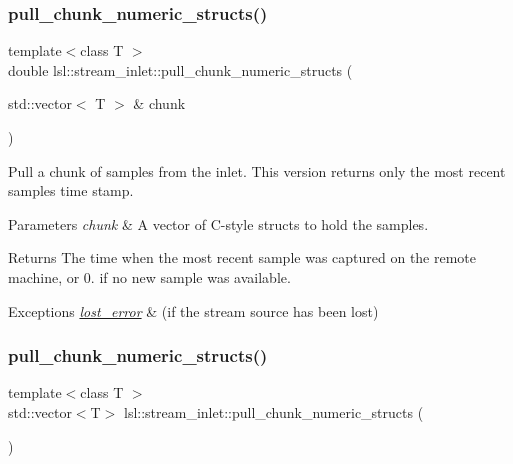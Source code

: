 \subsubsection{\texorpdfstring{pull\+\_\+chunk\+\_\+numeric\+\_\+structs()}{pull\_chunk\_numeric\_structs()}\hspace{0.1cm}{\footnotesize\ttfamily [2/3]}}
{\footnotesize\ttfamily template$<$class T $>$ \\
double lsl\+::stream\+\_\+inlet\+::pull\+\_\+chunk\+\_\+numeric\+\_\+structs (\begin{DoxyParamCaption}\item[{std\+::vector$<$ T $>$ \&}]{chunk }\end{DoxyParamCaption})\hspace{0.3cm}{\ttfamily [inline]}}

Pull a chunk of samples from the inlet. This version returns only the most recent sample\textquotesingle{}s time stamp. 
\begin{DoxyParams}{Parameters}
{\em chunk} & A vector of C-\/style structs to hold the samples. \\
\hline
\end{DoxyParams}
\begin{DoxyReturn}{Returns}
The time when the most recent sample was captured on the remote machine, or 0. if no new sample was available. 
\end{DoxyReturn}

\begin{DoxyExceptions}{Exceptions}
{\em \hyperlink{classlsl_1_1lost__error}{lost\+\_\+error}} & (if the stream source has been lost) \\
\hline
\end{DoxyExceptions}
\mbox{\label{classlsl_1_1stream__inlet_a4a743ed5df78b05dcc038e73a1d4fb9b}} 
\subsubsection{\texorpdfstring{pull\+\_\+chunk\+\_\+numeric\+\_\+structs()}{pull\_chunk\_numeric\_structs()}\hspace{0.1cm}{\footnotesize\ttfamily [3/3]}}
{\footnotesize\ttfamily template$<$class T $>$ \\
std\+::vector$<$T$>$ lsl\+::stream\+\_\+inlet\+::pull\+\_\+chunk\+\_\+numeric\+\_\+structs (\begin{DoxyParamCaption}{ }\end{DoxyParamCaption})\hspace{0.3cm}{\ttfamily [inline]}}

